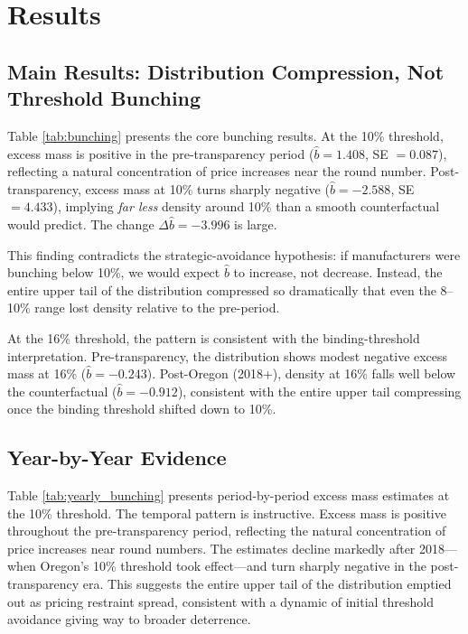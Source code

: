 \documentclass[12pt]{article}
\begin{document}
\section{Results}

\subsection{Main Results: Distribution Compression, Not Threshold Bunching}



Table \ref{tab:bunching} presents the core bunching results. At the 10\% threshold, excess mass is positive in the pre-transparency period ($\hat{b} = 1.408$, SE $= 0.087$), reflecting a natural concentration of price increases near the round number. Post-transparency, excess mass at 10\% turns sharply negative ($\hat{b} = -2.588$, SE $= 4.433$), implying \textit{far less} density around 10\% than a smooth counterfactual would predict. The change $\Delta\hat{b} = -3.996$ is large.

This finding contradicts the strategic-avoidance hypothesis: if manufacturers were bunching below 10\%, we would expect $\hat{b}$ to increase, not decrease. Instead, the entire upper tail of the distribution compressed so dramatically that even the 8--10\% range lost density relative to the pre-period.

At the 16\% threshold, the pattern is consistent with the binding-threshold interpretation. Pre-transparency, the distribution shows modest negative excess mass at 16\% ($\hat{b} = -0.243$). Post-Oregon (2018+), density at 16\% falls well below the counterfactual ($\hat{b} = -0.912$), consistent with the entire upper tail compressing once the binding threshold shifted down to 10\%.

\subsection{Year-by-Year Evidence}



Table \ref{tab:yearly_bunching} presents period-by-period excess mass estimates at the 10\% threshold. The temporal pattern is instructive. Excess mass is positive throughout the pre-transparency period, reflecting the natural concentration of price increases near round numbers. The estimates decline markedly after 2018---when Oregon's 10\% threshold took effect---and turn sharply negative in the post-transparency era. This suggests the entire upper tail of the distribution emptied out as pricing restraint spread, consistent with a dynamic of initial threshold avoidance giving way to broader deterrence.
\end{document}
